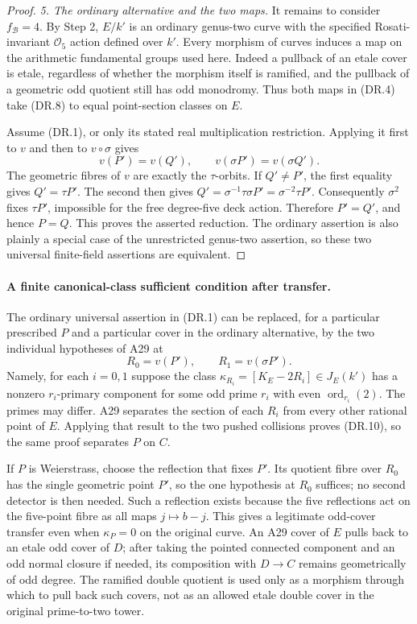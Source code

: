 \begin{proof}
\emph{5. The ordinary alternative and the two maps.}
It remains to consider $f_{\mathcal B}=4$.  By Step 2, $E/k'$ is an
ordinary genus-two curve with the specified Rosati-invariant
$\mathcal O_5$ action defined over $k'$.  Every morphism of curves induces a map on
the arithmetic fundamental groups used here.  Indeed a pullback of
an etale cover is etale, regardless of whether the morphism itself is
ramified, and the pullback of a geometric odd quotient still has odd
monodromy.  Thus both maps in (DR.4) take (DR.8) to equal point-section
classes on $E$.

Assume (DR.1), or only its stated real multiplication restriction.
Applying it first to $v$ and then to $v\circ\sigma$
gives
\[
                 v(P')=v(Q'),\qquad
                 v(\sigma P')=v(\sigma Q').
 \tag{DR.10}
\]
The geometric fibres of $v$ are exactly the $\tau$-orbits.  If
$Q'\ne P'$, the first equality gives $Q'=\tau P'$.  The second then
gives $Q'=\sigma^{-1}\tau\sigma P'=\sigma^{-2}\tau P'$.
Consequently $\sigma^2$ fixes $\tau P'$, impossible for the free
degree-five deck action.  Therefore $P'=Q'$, and hence $P=Q$.
This proves the asserted reduction.  The ordinary assertion is also
plainly a special case of the unrestricted genus-two assertion, so
these two universal finite-field assertions are equivalent.
\end{proof}

\paragraph{A finite canonical-class sufficient condition after transfer.}
The ordinary universal assertion in (DR.1) can be replaced, for a
particular prescribed $P$ and a particular cover in the ordinary
alternative, by the two individual hypotheses of A29 at
\[
                 R_0=v(P'),\qquad R_1=v(\sigma P').
 \tag{DR.11}
\]
Namely, for each $i=0,1$ suppose the class
$\kappa_{R_i}=[K_E-2R_i]\in J_E(k')$ has a nonzero $r_i$-primary
component for some odd prime $r_i$ with even
$\operatorname{ord}_{r_i}(2)$.  The primes may differ.  A29 separates
the section of each $R_i$ from every other rational point of $E$.
Applying that result to the two pushed collisions proves (DR.10), so
the same proof separates $P$ on $C$.

If $P$ is Weierstrass, choose the reflection that fixes $P'$.  Its
quotient fibre over $R_0$ has the single geometric point $P'$, so the
one hypothesis at $R_0$ suffices; no second detector is then needed.
Such a reflection exists because the five reflections act on the
five-point fibre as all maps $j\mapsto b-j$.  This gives a legitimate
odd-cover transfer even when $\kappa_P=0$ on the original curve.
An A29 cover of $E$ pulls back to an etale odd cover of $D$; after
taking the pointed connected component and an odd normal closure if
needed, its composition with $D\to C$ remains geometrically of odd
degree.  The ramified double quotient is used only as a morphism
through which to pull back such covers, not as an allowed etale
double cover in the original prime-to-two tower.

